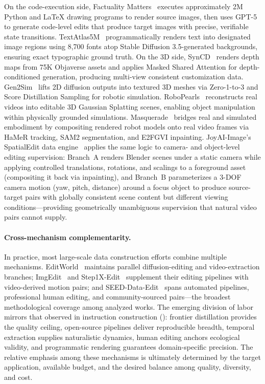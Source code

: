 On the code-execution side, Factuality Matters~\citep{zhuo2025factuality} executes approximately 2M Python and \LaTeX{} drawing programs to render source images, then uses GPT-5 to generate code-level edits that produce target images with precise, verifiable state transitions. TextAtlas5M~\citep{wang2025textatlas5m} programmatically renders text into designated image regions using 8,700 fonts atop Stable Diffusion 3.5-generated backgrounds, ensuring exact typographic ground truth. On the 3D side, SynCD~\citep{kumari2025generating} renders depth maps from 75K Objaverse assets and applies Masked Shared Attention for depth-conditioned generation, producing multi-view consistent customization data. Gen2Sim~\citep{katara2024gen2sim} lifts 2D diffusion outputs into textured 3D meshes via Zero-1-to-3 and Score Distillation Sampling for robotic simulation. RoboPearls~\citep{tao2025robopearls} reconstructs real videos into editable 3D Gaussian Splatting scenes, enabling object manipulation within physically grounded simulations. Masquerade~\citep{lepert2025masquerade} bridges real and simulated embodiment by compositing rendered robot models onto real video frames via HaMeR tracking, SAM2 segmentation, and E2FGVI inpainting. JoyAI-Image's SpatialEdit data engine~\citep{jdjoyaiimage} applies the same logic to camera- and object-level editing supervision: Branch~A renders Blender scenes under a static camera while applying controlled translations, rotations, and scalings to a foreground asset (compositing it back via inpainting), and Branch~B parameterizes a 3-DOF camera motion (yaw, pitch, distance) around a focus object to produce source-target pairs with globally consistent scene content but different viewing conditions---providing geometrically unambiguous supervision that natural video pairs cannot supply.

\paragraph{Cross-mechanism complementarity.}
In practice, most large-scale data construction efforts combine multiple mechanisms. EditWorld~\citep{zeng2025editworld} maintains parallel diffusion-editing and video-extraction branches; ImgEdit~\citep{ye2025imgedit} and Step1X-Edit~\citep{liu2025step1x} supplement their editing pipelines with video-derived motion pairs; and SEED-Data-Edit~\citep{ge2024seed} spans automated pipelines, professional human editing, and community-sourced pairs---the broadest methodological coverage among analyzed works. The emerging division of labor mirrors that observed in instruction construction (): frontier distillation provides the quality ceiling, open-source pipelines deliver reproducible breadth, temporal extraction supplies naturalistic dynamics, human editing anchors ecological validity, and programmatic rendering guarantees domain-specific precision. The relative emphasis among these mechanisms is ultimately determined by the target application, available budget, and the desired balance among quality, diversity, and cost.
